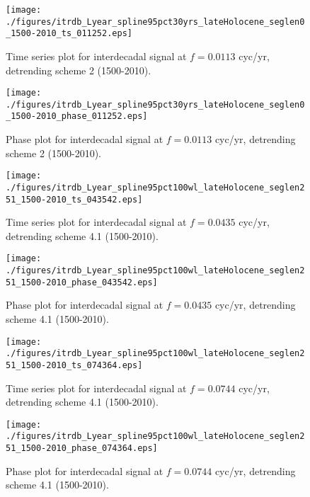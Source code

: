 \documentclass[phd,tocprelim]{cornell}
\begin{document}
\clearpage
\newpage

\begin{figure}[!tbp]
\centering
\begin{minipage}[b]{0.45\textwidth}
\texttt{[image: ./figures/itrdb\_Lyear\_spline95pct30yrs\_lateHolocene\_seglen0\_1500-2010\_ts\_011252.eps]}
\caption{Time series plot for interdecadal signal at $f=0.0113$ cyc/yr, detrending scheme 2 (1500-2010).}
\label{ts2pl1}
\end{minipage}
\hfill
\begin{minipage}[b]{0.45\textwidth}
\texttt{[image: ./figures/itrdb\_Lyear\_spline95pct30yrs\_lateHolocene\_seglen0\_1500-2010\_phase\_011252.eps]}
\caption{Phase plot for interdecadal signal at $f=0.0113$ cyc/yr, detrending scheme 2 (1500-2010).}
\label{map2pl1}
\end{minipage}
\end{figure}

\begin{figure}[!tbp]
\centering
\begin{minipage}[b]{0.45\textwidth}
\texttt{[image: ./figures/itrdb\_Lyear\_spline95pct100wl\_lateHolocene\_seglen251\_1500-2010\_ts\_043542.eps]}
\caption{Time series plot for interdecadal signal at $f=0.0435$ cyc/yr, detrending scheme 4.1 (1500-2010).}
\label{ts4.1pl1}
\end{minipage}
\hfill
\begin{minipage}[b]{0.45\textwidth}
\texttt{[image: ./figures/itrdb\_Lyear\_spline95pct100wl\_lateHolocene\_seglen251\_1500-2010\_phase\_043542.eps]}
\caption{Phase plot for interdecadal signal at $f=0.0435$ cyc/yr, detrending scheme 4.1 (1500-2010).}
\label{map4.1pl1}
\end{minipage}
\end{figure}

\begin{figure}[!tbp]
\centering
\begin{minipage}[b]{0.45\textwidth}
\texttt{[image: ./figures/itrdb\_Lyear\_spline95pct100wl\_lateHolocene\_seglen251\_1500-2010\_ts\_074364.eps]}
\caption{Time series plot for interdecadal signal at $f=0.0744$ cyc/yr, detrending scheme 4.1 (1500-2010).}
\label{ts4.1pl2}
\end{minipage}
\hfill
\begin{minipage}[b]{0.45\textwidth}
\texttt{[image: ./figures/itrdb\_Lyear\_spline95pct100wl\_lateHolocene\_seglen251\_1500-2010\_phase\_074364.eps]}
\caption{Phase plot for interdecadal signal at $f=0.0744$ cyc/yr, detrending scheme 4.1 (1500-2010).}
\label{map4.1pl2}
\end{minipage}
\end{figure}
\end{document}
